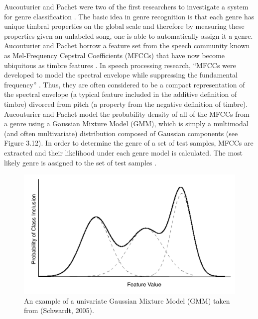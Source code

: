 \documentclass[a4paper,12pt]{report} 	%
\numberwithin{figure}{chapter}
\numberwithin{table}{chapter}
\numberwithin{equation}{chapter}
\begin{document}
\begin{flushleft}
Aucouturier and Pachet were two of the first researchers to investigate a system for genre classification \cite{Aucouturier:2002gf}. The basic idea in genre recognition is that each genre has unique timbral properties on the global scale and therefore by measuring these properties given an unlabeled song, one is able to automatically assign it a genre. Aucouturier and Pachet borrow a feature set from the speech community known as Mel-Frequency Cepstral Coefficients (MFCCs) that have now become ubiquitous as timbre features \cite[p. 1]{Aucouturier:2002gf}. In speech processing research, ``MFCCs were developed to model the spectral envelope while suppressing the fundamental frequency'' \cite[p. 1]{Jensen:2006dw}. Thus, they are often considered to be a compact representation of the spectral envelope (a typical feature included in the additive definition of timbre) divorced from pitch (a property from the negative definition of timbre). Aucouturier and Pachet model the probability density of all of the MFCCs from a genre using a Gaussian Mixture Model (GMM), which is simply a multimodal (and often multivariate) distribution composed of Gaussian components (see Figure 3.12). In order to determine the genre of a set of test samples, MFCCs are extracted and their likelihood under each genre model is calculated. The most likely genre is assigned to the set of test samples \cite[p. 2]{Aucouturier:2002gf}.
\\
\begin{figure}[h!]
\begin{center}
\includegraphics[scale=0.70]{GMM}
\caption[Gaussian Mixture Models]{An example of a univariate Gaussian Mixture Model (GMM) taken from (Schwardt, 2005).}
\end{center}
\end{figure}

\end{flushleft}
\end{document}
